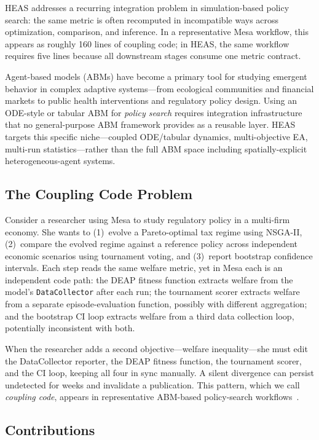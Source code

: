 \documentclass{wscpaperproc}
\begin{document}
HEAS addresses a recurring integration problem in simulation-based policy
search: the same metric is often recomputed in incompatible ways across
optimization, comparison, and inference. In a representative Mesa workflow,
this appears as roughly 160 lines of coupling code; in HEAS, the same workflow
requires five lines because all downstream stages consume one metric contract.

Agent-based models (ABMs) have become a primary tool for studying emergent
behavior in complex adaptive systems---from ecological communities and financial
markets to public health interventions and regulatory policy design. Using an
ODE-style or tabular ABM for \emph{policy search} requires integration
infrastructure that no general-purpose ABM framework provides as a reusable
layer. HEAS targets this specific niche---coupled ODE/tabular dynamics,
multi-objective EA, multi-run statistics---rather than the full ABM space
including spatially-explicit heterogeneous-agent systems.

\subsection{The Coupling Code Problem}

Consider a researcher using Mesa to study regulatory policy in a multi-firm
economy. She wants to (1)~evolve a Pareto-optimal tax regime using NSGA-II,
(2)~compare the evolved regime against a reference policy across independent
economic scenarios using tournament voting, and (3)~report bootstrap confidence
intervals. Each step reads the same welfare metric, yet in Mesa each is an
independent code path: the DEAP fitness function extracts welfare from the
model's \texttt{DataCollector} after each run; the tournament scorer extracts
welfare from a separate episode-evaluation function, possibly with different
aggregation; and the bootstrap CI loop extracts welfare from a third data
collection loop, potentially inconsistent with both.

When the researcher adds a second objective---welfare inequality---she must edit
the DataCollector reporter, the DEAP fitness function, the tournament scorer, and
the CI loop, keeping all four in sync manually. A silent divergence can persist
undetected for weeks and invalidate a publication. This pattern, which we call
\emph{coupling code}, appears in representative ABM-based policy-search
workflows~\cite{pangallo2019best,capri2023transport}.

\subsection{Contributions}
\end{document}
